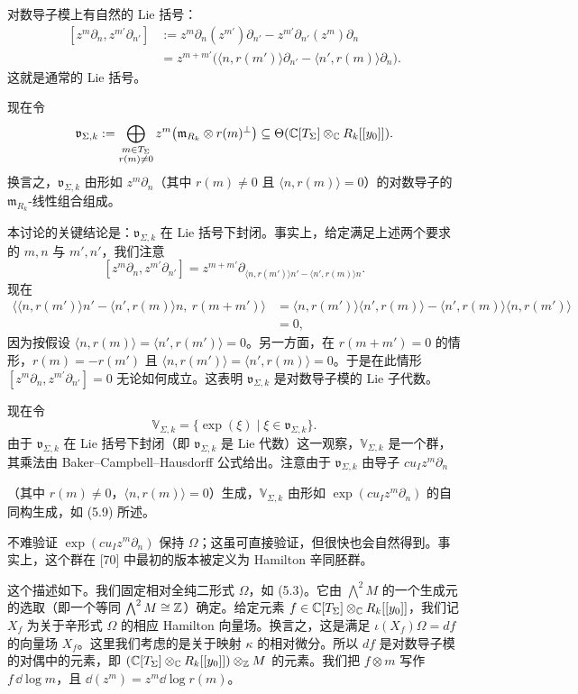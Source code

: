 对数导子模上有自然的 Lie 括号：
\[
  \begin{aligned}
    [z^m\partial_n,z^{m'}\partial_{n'}]
    &:=z^m\partial_n(z^{m'})\partial_{n'}-z^{m'}\partial_{n'}(z^m)\partial_n\\
    &=z^{m+m'}\bigl(\langle n,r(m')\rangle\partial_{n'}-\langle n',r(m)\rangle\partial_n\bigr).
  \end{aligned}
\]
这就是通常的 Lie 括号。

现在令
\[
  \mathfrak v_{\Sigma,k}
  :=\bigoplus_{\substack{m\in T_\Sigma\\ r(m)\ne0}}z^m\bigl(\mathfrak m_{R_k}\otimes r(m)^{\perp}\bigr)
  \subseteq\Theta(\mathbb{C}[T_\Sigma]\otimes_{\mathbb{C}} R_k[[y_0]]).
\]
换言之，$\mathfrak v_{\Sigma,k}$ 由形如 $z^m\partial_n$（其中 $r(m)\ne0$ 且 $\langle n,r(m)\rangle=0$）的对数导子的 $\mathfrak m_{R_k}$-线性组合组成。

本讨论的关键结论是：$\mathfrak v_{\Sigma,k}$ 在 Lie 括号下封闭。事实上，给定满足上述两个要求的 $m,n$ 与 $m',n'$，我们注意
\[
  [z^m\partial_n,z^{m'}\partial_{n'}]
  =z^{m+m'}\partial_{\langle n,r(m')\rangle n'-\langle n',r(m)\rangle n}.
\]
现在
\[
  \begin{aligned}
    \bigl\langle\langle n,r(m')\rangle n'-\langle n',r(m)\rangle n,\ r(m+m')\bigr\rangle
    &=\langle n,r(m')\rangle\langle n',r(m)\rangle-\langle n',r(m)\rangle\langle n,r(m')\rangle\\
    &=0,
  \end{aligned}
\]
因为按假设 $\langle n,r(m)\rangle=\langle n',r(m')\rangle=0$。另一方面，在 $r(m+m')=0$ 的情形，$r(m)=-r(m')$ 且 $\langle n,r(m')\rangle=\langle n',r(m)\rangle=0$。于是在此情形 $[z^m\partial_n,z^{m'}\partial_{n'}]=0$ 无论如何成立。这表明 $\mathfrak v_{\Sigma,k}$ 是对数导子模的 Lie 子代数。

现在令
\[
  \mathbb V_{\Sigma,k}=\{\exp(\xi)\mid\xi\in\mathfrak v_{\Sigma,k}\}.
\]
由于 $\mathfrak v_{\Sigma,k}$ 在 Lie 括号下封闭（即 $\mathfrak v_{\Sigma,k}$ 是 Lie 代数）这一观察，$\mathbb V_{\Sigma,k}$ 是一个群，其乘法由 Baker--Campbell--Hausdorff 公式给出。注意由于 $\mathfrak v_{\Sigma,k}$ 由导子 $cu_Iz^m\partial_n$

（其中 $r(m)\ne0$，$\langle n,r(m)\rangle=0$）生成，$\mathbb V_{\Sigma,k}$ 由形如 $\exp(cu_Iz^m\partial_n)$ 的自同构生成，如 (5.9) 所述。

不难验证 $\exp(cu_Iz^m\partial_n)$ 保持 $\Omega$；这虽可直接验证，但很快也会自然得到。事实上，这个群在 [70] 中最初的版本被定义为 Hamilton 辛同胚群。

这个描述如下。我们固定相对全纯二形式 $\Omega$，如 (5.3)。它由 $\bigwedge^2M$ 的一个生成元的选取（即一个等同 $\bigwedge^2M\cong\mathbb{Z}$）确定。给定元素 $f\in\mathbb{C}[T_\Sigma]\otimes_{\mathbb{C}} R_k[[y_0]]$，我们记 $X_f$ 为关于辛形式 $\Omega$ 的相应 Hamilton 向量场。换言之，这是满足 $\iota(X_f)\Omega=df$ 的向量场 $X_f$。这里我们考虑的是关于映射 $\kappa$ 的相对微分。所以 $df$ 是对数导子模的对偶中的元素，即 $(\mathbb{C}[T_\Sigma]\otimes_{\mathbb{C}} R_k[[y_0]])\otimes_{\mathbb{Z}} M$ 的元素。我们把 $f\otimes m$ 写作 $f\,\dd\log m$，且 $\dd(z^m)=z^m\dd\log r(m)$。

